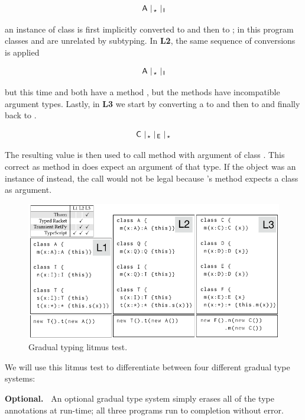 \documentclass[USenglish]{tex/lipics-v2016}
\begin{document}
\vspace{-5mm}
\[{\sf{A}} ~\vert_{\,\star} ~ \vert_{\,{\sf{I}}}\] 

\vspace{-2mm}\noindent
an instance of 
class \A is first implicitly converted to \any and then to \I; in this program
classes \A and \I are unrelated by subtyping. In {\bf L2}, the same sequence
of conversions is applied

\vspace{-6mm}
\[{\sf{A}}~ \vert_{\,\star} ~ \vert_{\,{\sf{I}}}\] 

\vspace{-2mm}\noindent
but this time \A and \I both have a
method \m, but the methods have incompatible argument types.  Lastly, in
{\bf L3} we start by converting a \C to \any and then to \E
and finally back to \any.

\vspace{-6mm}
\[\C~ \vert_{\,\any}~\vert_{\,\E}~\vert_{\,\any}\]

\vspace{-2mm}\noindent
The resulting value is then used to call  method \m with argument of class \C.
This correct as method \m in \C does expect an
argument of that type. If the object was an instance of \E instead, the call
would not be legal because \E's method \m expects a class \D as argument.

\begin{figure}[!b] \includegraphics[width=.95\columnwidth]{../figures/litm}
  \caption{Gradual typing litmus test.}\label{litmus}
\end{figure}

\noindent We will use this litmus test to differentiate between four different
gradual type systems:

\vspace{2mm}\noindent
{\bf Optional.~} An optional gradual type system simply erases all of the
type annotations at run-time; all three programs run to completion without
error.
\end{document}
